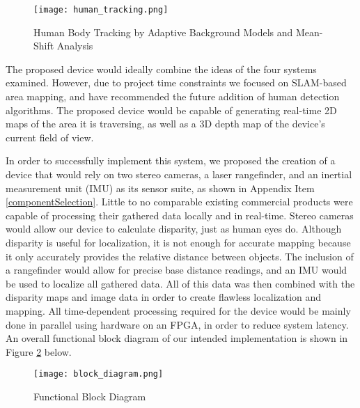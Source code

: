 \begin{figure}[H]
	\centerline{\texttt{[image: human\_tracking.png]}}
	\caption{\small{Human Body Tracking by Adaptive Background Models and Mean-Shift Analysis \cite{porikli}}}
	\label{human_tracking}
\end{figure}

The proposed device would ideally combine the ideas of the four systems examined. However, due to project time constraints we focused on SLAM-based area mapping, and have recommended the future addition of human detection algorithms. The proposed device would be capable of generating real-time 2D maps of the area it is traversing, as well as a 3D depth map of the device’s current field of view.
\par
In order to successfully implement this system, we proposed the creation of a device that would rely on two stereo cameras, a laser rangefinder, and an inertial measurement unit (IMU) as its sensor suite, as shown in Appendix Item \ref{componentSelection}. Little to no comparable existing commercial products were capable of processing their gathered data locally and in real-time. Stereo cameras would allow our device to calculate disparity, just as human eyes do. Although disparity is useful for localization, it is not enough for accurate mapping because it only accurately provides the relative distance between objects. The inclusion of a rangefinder would allow for precise base distance readings, and an IMU would be used to localize all gathered data. All of this data was then combined with the disparity maps and image data in order to create flawless localization and mapping. All time-dependent processing required for the device would be mainly done in parallel using hardware on an FPGA, in order to reduce system latency. An overall functional block diagram of our intended implementation is shown in Figure \ref{orig_bd} below.

\begin{figure}[H]
	\centerline{\texttt{[image: block\_diagram.png]}}
	\caption{Functional Block Diagram}
	\label{orig_bd}
\end{figure}

